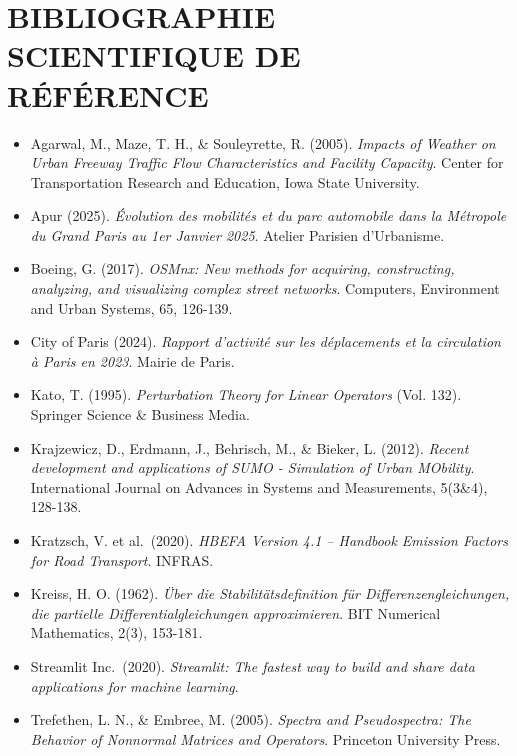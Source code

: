\documentclass[11pt, a4paper]{article}
\providecommand{\tightlist}{}
\begin{document}
\newpage

\section{BIBLIOGRAPHIE SCIENTIFIQUE DE
RÉFÉRENCE}\label{bibliographie-scientifique-de-ruxe9fuxe9rence}

\begin{itemize}
\tightlist
\item
  Agarwal, M., Maze, T. H., \& Souleyrette, R. (2005). \emph{Impacts of
  Weather on Urban Freeway Traffic Flow Characteristics and Facility
  Capacity}. Center for Transportation Research and Education, Iowa
  State University.
\item
  Apur (2025). \emph{Évolution des mobilités et du parc automobile dans
  la Métropole du Grand Paris au 1er Janvier 2025}. Atelier Parisien
  d'Urbanisme.
\item
  Boeing, G. (2017). \emph{OSMnx: New methods for acquiring,
  constructing, analyzing, and visualizing complex street networks}.
  Computers, Environment and Urban Systems, 65, 126-139.
\item
  City of Paris (2024). \emph{Rapport d'activité sur les déplacements et
  la circulation à Paris en 2023}. Mairie de Paris.
\item
  Kato, T. (1995). \emph{Perturbation Theory for Linear Operators} (Vol.
  132). Springer Science \& Business Media.
\item
  Krajzewicz, D., Erdmann, J., Behrisch, M., \& Bieker, L. (2012).
  \emph{Recent development and applications of SUMO - Simulation of
  Urban MObility}. International Journal on Advances in Systems and
  Measurements, 5(3\&4), 128-138.
\item
  Kratzsch, V. et al.~(2020). \emph{HBEFA Version 4.1 -- Handbook
  Emission Factors for Road Transport}. INFRAS.
\item
  Kreiss, H. O. (1962). \emph{Über die Stabilitätsdefinition für
  Differenzengleichungen, die partielle Differentialgleichungen
  approximieren}. BIT Numerical Mathematics, 2(3), 153-181.
\item
  Streamlit Inc.~(2020). \emph{Streamlit: The fastest way to build and
  share data applications for machine learning}.
\item
  Trefethen, L. N., \& Embree, M. (2005). \emph{Spectra and
  Pseudospectra: The Behavior of Nonnormal Matrices and Operators}.
  Princeton University Press.
\end{itemize}
\end{document}

